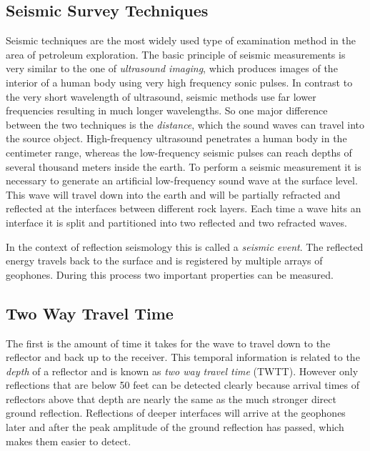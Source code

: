 \documentclass[twocolumn]{article}
\begin{document}
\subsection{Seismic Survey Techniques}
Seismic techniques are the most widely used type of examination method in the area of petroleum exploration. The basic principle of seismic measurements is very similar to the one of \textit{ultrasound imaging}, which produces images of the interior of a human body using very high frequency sonic pulses. 
In contrast to the very short wavelength of ultrasound, seismic methods use far lower frequencies resulting in much longer wavelengths. So one major difference between the two techniques is the \textit{distance}, which the sound waves can travel into the source object. High-frequency ultrasound penetrates a human body in the centimeter range, whereas the low-frequency seismic pulses can reach depths of several thousand meters inside the earth. To perform a seismic measurement it is necessary to generate an artificial low-frequency sound wave at the surface level. This wave will travel down into the earth and will be partially refracted and reflected at the interfaces between different rock layers. Each time a wave hits an interface it is split and partitioned into two reflected and two refracted waves.

In the context of reflection seismology this is called a \textit{seismic event}. The reflected energy travels back to the surface and is registered by multiple arrays of geophones. During this process two important properties can be measured.

\subsection*{Two Way Travel Time}
The first is the amount of time it takes for the wave to travel down to the reflector and back up to the receiver. This temporal information is related to the \textit{depth} of a reflector and is known as \textit{two way travel time} (TWTT). However only reflections that are below 50 feet can be detected clearly because arrival times of reflectors above that depth are nearly the same as the much stronger direct ground reflection. Reflections of deeper interfaces will arrive at the geophones later and after the peak amplitude of the ground reflection has passed, which makes them easier to detect.
\end{document}
